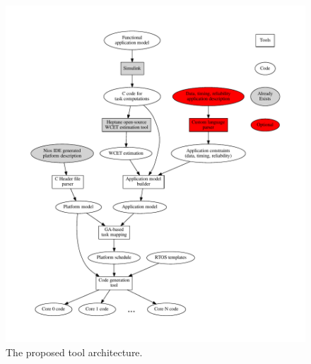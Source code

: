 \documentclass[table,11pt]{article}
\begin{document}
\begin{figure}[h]
\centering
\includegraphics[scale=0.8]{figures/tool_arch}
\caption{The proposed tool architecture.}
\label{f:tool_arch}
\end{figure}
% 
% 
% 
\end{document}
